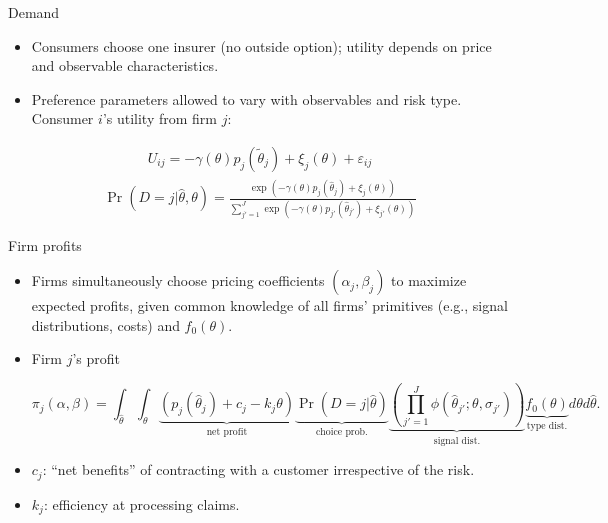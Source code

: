 \documentclass[10pt,aspectratio=169]{beamer}
\begin{document}
\begin{frame}{Demand}
\justifying
\begin{itemize}
  \item Consumers choose one insurer (no outside option); utility depends on price and observable characteristics.
  \item Preference parameters allowed to vary with observables and risk type. Consumer $i$'s utility from firm $j$:
\end{itemize}
\begin{align}
  U_{ij} = -\gamma(\theta)p_j(\tilde{\theta}_j) + \xi_j(\theta) + \varepsilon_{ij} 
\end{align}
\begin{align}
  \Pr(D=j|\hat{\theta}, \theta) = \frac{\exp(-\gamma(\theta)p_j(\hat{\theta}_j) + \xi_j(\theta))}{\sum_{j'=1}^{J}\exp(-\gamma(\theta)p_{j'}(\hat{\theta}_{j'}) + \xi_{j'}(\theta))} 
\end{align}
\end{frame}

\begin{frame}{Firm profits}
    \begin{itemize}
        \item Firms simultaneously choose pricing coefficients $(\alpha_j, \beta_j)$ to maximize expected profits, given common knowledge of all firms' primitives (e.g., signal distributions, costs) and $f_0(\theta)$.
        
        \medskip
        \item Firm $j$'s profit 
        
        \[\pi_j(\alpha, \beta) = 
        \int_{\hat{\theta}} \int_{\theta} \underbrace{(p_j(\hat{\theta}_j) + c_j - k_j\theta)}_{\text{net profit}} \underbrace{\Pr(D=j|\hat{\theta})}_{\text{choice prob.}} \underbrace{\left(\prod_{j'=1}^{J} \phi(\hat{\theta}_{j'}; \theta, \sigma_{j'}) \right)}_{\text{signal dist.}} \underbrace{f_0(\theta)}_{\text{type dist.}} d\theta d\hat{\theta}.
        \]
        
        \medskip
        \item $c_j$: ``net benefits'' of contracting with a customer irrespective of the risk.
        
        \item $k_j$: efficiency at processing claims.
    \end{itemize}
\end{frame}


\end{document}
